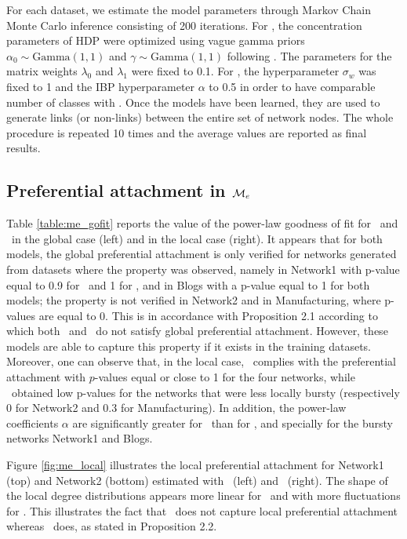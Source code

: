 For each dataset, we estimate the model parameters through Markov Chain Monte Carlo inference consisting of 200 iterations. For \imb, the concentration parameters of HDP were optimized  using vague gamma priors $\alpha_0 \sim \text{Gamma}(1,1)$ and $\gamma \sim \text{Gamma}(1,1)$ following \cite{HDP}. The parameters for the matrix weights  $\lambda_0$ and $\lambda_1$ were fixed to 0.1. For \ifm, the hyperparameter  $\sigma_w$ was fixed to 1 and the IBP hyperparameter $\alpha$ to 0.5 in order to  have comparable number of classes with \imb. Once the models have been learned, they are used to generate links (or non-links) between the entire set of network nodes. The whole procedure is repeated 10 times and the average values are reported as final results.


\subsection{Preferential attachment in $\mathcal{M}_e$}

Table \ref{table:me_gofit} reports the value of the power-law goodness of fit for \imb\ and \ifm\ in the global case (left) and in the local case (right). It appears that for both models, the global preferential attachment is only verified for networks generated from datasets where the property was observed, namely in Network1 with p-value equal to 0.9 for \imb\ and 1 for \ifm, and in Blogs with a p-value equal to 1 for both models; the property is not verified in Network2 and in Manufacturing, where p-values are equal to 0. This is in accordance with Proposition 2.1 according to which both \ifm\ and \imb\ do not satisfy global preferential attachment. However, these models are able to capture this property if it exists in the training datasets.  Moreover, one can observe that, in the local case, \imb\ complies with the preferential attachment with $p$-values equal or close to 1 for the four networks, while \ifm\ obtained low p-values for the networks that were less locally bursty (respectively  0  for Network2 and 0.3 for Manufacturing). In addition, the power-law coefficients $\alpha$ are significantly greater for \imb\ than for \ifm, and specially for the bursty networks Network1 and Blogs.

Figure \ref{fig:me_local} illustrates the local preferential attachment for Network1 (top) and Network2 (bottom) estimated with \imb\ (left) and \ifm\ (right). The shape of the local degree distributions appears more linear for \imb\ and with more fluctuations for \ifm. This illustrates the fact that \ifm\ does not capture local preferential attachment whereas \imb\ does, as stated in Proposition 2.2. 

